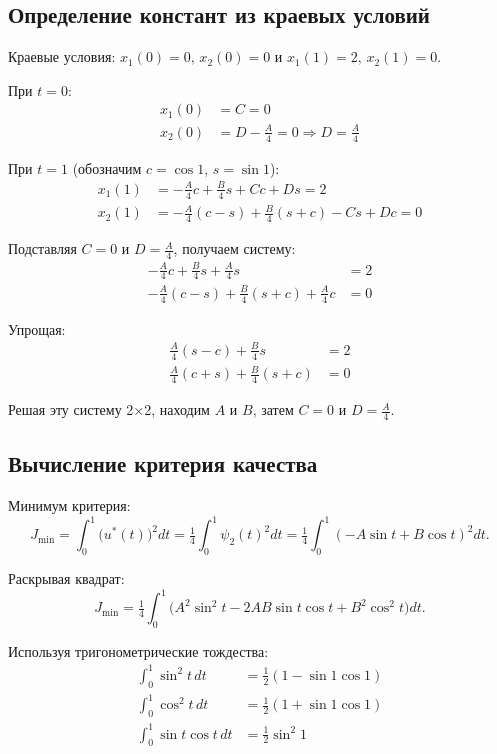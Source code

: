 \subsection{Определение констант из краевых условий}
Краевые условия: \(x_1(0)=0,\,x_2(0)=0\) и \(x_1(1)=2,\,x_2(1)=0\).

При \(t=0\):
\begin{align}
x_1(0) &= C = 0 \\
x_2(0) &= D - \tfrac{A}{4} = 0 \Rightarrow D = \tfrac{A}{4}
\end{align}

При \(t=1\) (обозначим \(c=\cos 1\), \(s=\sin 1\)):
\begin{align}
x_1(1) &= -\tfrac{A}{4}c + \tfrac{B}{4}s + Cc + Ds = 2 \\
x_2(1) &= -\tfrac{A}{4}(c-s) + \tfrac{B}{4}(s+c) - Cs + Dc = 0
\end{align}

Подставляя \(C=0\) и \(D=\tfrac{A}{4}\), получаем систему:
\begin{align}
-\tfrac{A}{4}c + \tfrac{B}{4}s + \tfrac{A}{4}s &= 2 \\
-\tfrac{A}{4}(c-s) + \tfrac{B}{4}(s+c) + \tfrac{A}{4}c &= 0
\end{align}

Упрощая:
\begin{align}
\tfrac{A}{4}(s-c) + \tfrac{B}{4}s &= 2 \\
\tfrac{A}{4}(c+s) + \tfrac{B}{4}(s+c) &= 0
\end{align}

Решая эту систему 2×2, находим \(A\) и \(B\), затем \(C=0\) и \(D=\tfrac{A}{4}\).

\subsection{Вычисление критерия качества}
Минимум критерия:
\[
 J_{\min}=\int_0^1 \big(u^*(t)\big)^2 dt = \tfrac{1}{4}\int_0^1\psi_2(t)^2 dt = \tfrac{1}{4}\int_0^1(-A\sin t + B\cos t)^2 dt.
\]

Раскрывая квадрат:
\[
J_{\min} = \tfrac{1}{4}\int_0^1\big(A^2\sin^2 t - 2AB\sin t\cos t + B^2\cos^2 t\big) dt.
\]

Используя тригонометрические тождества:
\begin{align}
\int_0^1 \sin^2 t \, dt &= \tfrac{1}{2}(1 - \sin 1 \cos 1) \\
\int_0^1 \cos^2 t \, dt &= \tfrac{1}{2}(1 + \sin 1 \cos 1) \\
\int_0^1 \sin t \cos t \, dt &= \tfrac{1}{2}\sin^2 1
\end{align}

